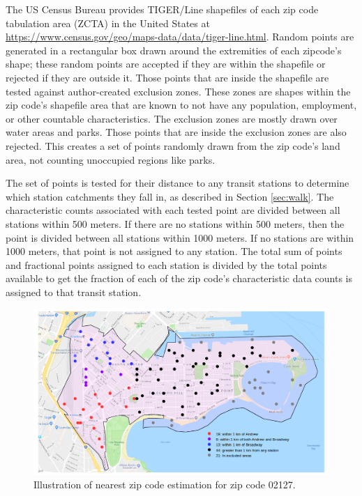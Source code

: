 \documentclass[11pt]{report}
\begin{document}
The US Census Bureau provides TIGER/Line shapefiles of each zip code tabulation area (ZCTA) in the United States at \url{https://www.census.gov/geo/maps-data/data/tiger-line.html}. Random points are generated in a rectangular box drawn around the extremities of each zipcode's shape; these random points are accepted if they are within the shapefile or rejected if they are outside it. Those points that are inside the shapefile are tested against author-created exclusion zones. These zones are shapes within the zip code's shapefile area that are known to not have any population, employment, or other countable characteristics. The exclusion zones are mostly drawn over water areas and parks. Those points that are inside the exclusion zones are also rejected. This creates a set of points randomly drawn from the zip code's land area, not counting unoccupied regions like parks. 

The set of points is tested for their distance to any transit stations to determine which station catchments they fall in, as described in Section \ref{sec:walk}. The characteristic counts associated with each tested point are divided between all stations within 500 meters. If there are no stations within 500 meters, then the point is divided between all stations within 1000 meters. If no stations are within 1000 meters, that point is not assigned to any station. The total sum of points and fractional points assigned to each station is divided by the total points available to get the fraction of each of the zip code's characteristic data counts is assigned to that transit station. 

\begin{figure}
\begin{center}\includegraphics[scale=0.55]{geo_point_demonstration}\end{center}\caption{Illustration of nearest zip code estimation for zip code 02127.}\label{fig:f1}
\end{figure}
\end{document}
